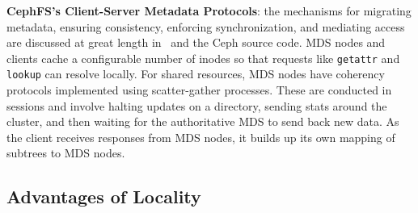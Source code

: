 \textbf{CephFS's Client-Server Metadata Protocols}: the mechanisms for migrating metadata, ensuring consistency, enforcing synchronization, and mediating access are discussed at great length in~\cite{weil:phdthesis07} and the Ceph source code. MDS nodes and clients cache a configurable number of inodes so that requests like \texttt{getattr} and \texttt{lookup} can resolve locally.  For shared resources, MDS nodes have coherency protocols implemented using scatter-gather processes. These are conducted in sessions and involve halting updates on a directory, sending stats around the cluster, and then waiting for the authoritative MDS to send back new data. As the client receives responses from MDS nodes, it builds up its own mapping of subtrees to MDS nodes. 

\subsection{Advantages of Locality}
\label{advantages_of_locality}
